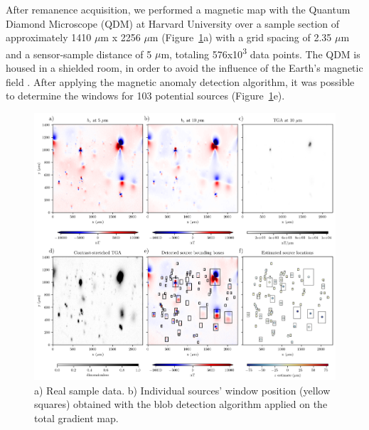 After remanence acquisition, we performed a magnetic map with the Quantum
Diamond Microscope (QDM) at Harvard University over a sample section of
approximately 1410 $\mu$m x 2256 $\mu$m (Figure~\ref{real-data}a) with a grid
spacing of 2.35 $\mu$m and a sensor-sample distance of 5 $\mu$m, totaling
576x10\textsuperscript{3} data points. The QDM is housed in a shielded room, in
order to avoid the influence of the Earth's magnetic field \citep{Fu2020,
Glenn2017}. After applying the magnetic anomaly detection algorithm, it was
possible to determine the windows for 103 potential sources
(Figure~\ref{real-data}e).

\begin{figure}[tb]
\centering
\includegraphics[width=1\linewidth]{figures/real-data.png}
\caption{
a) Real sample data. b) Individual sources' window position (yellow squares)
obtained with the blob detection algorithm applied on the total gradient map.
}
\label{real-data}
\end{figure}

